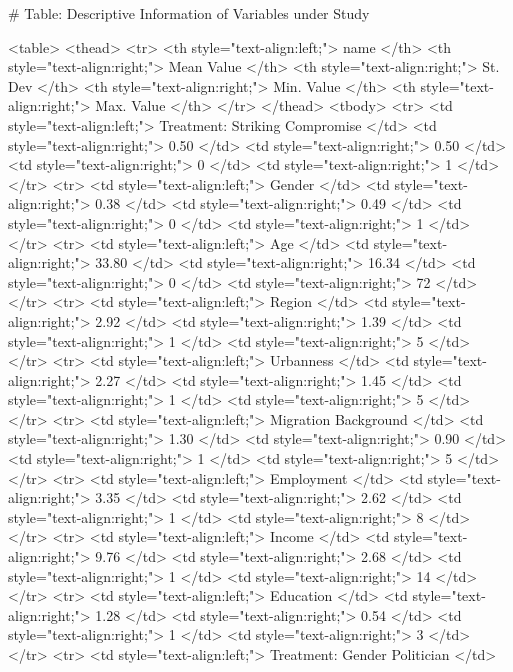 # Table: Descriptive Information of Variables under Study 

<table>
 <thead>
  <tr>
   <th style="text-align:left;"> name </th>
   <th style="text-align:right;"> Mean Value </th>
   <th style="text-align:right;"> St. Dev </th>
   <th style="text-align:right;"> Min. Value </th>
   <th style="text-align:right;"> Max. Value </th>
  </tr>
 </thead>
<tbody>
  <tr>
   <td style="text-align:left;"> Treatment: Striking Compromise </td>
   <td style="text-align:right;"> 0.50 </td>
   <td style="text-align:right;"> 0.50 </td>
   <td style="text-align:right;"> 0 </td>
   <td style="text-align:right;"> 1 </td>
  </tr>
  <tr>
   <td style="text-align:left;"> Gender </td>
   <td style="text-align:right;"> 0.38 </td>
   <td style="text-align:right;"> 0.49 </td>
   <td style="text-align:right;"> 0 </td>
   <td style="text-align:right;"> 1 </td>
  </tr>
  <tr>
   <td style="text-align:left;"> Age </td>
   <td style="text-align:right;"> 33.80 </td>
   <td style="text-align:right;"> 16.34 </td>
   <td style="text-align:right;"> 0 </td>
   <td style="text-align:right;"> 72 </td>
  </tr>
  <tr>
   <td style="text-align:left;"> Region </td>
   <td style="text-align:right;"> 2.92 </td>
   <td style="text-align:right;"> 1.39 </td>
   <td style="text-align:right;"> 1 </td>
   <td style="text-align:right;"> 5 </td>
  </tr>
  <tr>
   <td style="text-align:left;"> Urbanness </td>
   <td style="text-align:right;"> 2.27 </td>
   <td style="text-align:right;"> 1.45 </td>
   <td style="text-align:right;"> 1 </td>
   <td style="text-align:right;"> 5 </td>
  </tr>
  <tr>
   <td style="text-align:left;"> Migration Background </td>
   <td style="text-align:right;"> 1.30 </td>
   <td style="text-align:right;"> 0.90 </td>
   <td style="text-align:right;"> 1 </td>
   <td style="text-align:right;"> 5 </td>
  </tr>
  <tr>
   <td style="text-align:left;"> Employment </td>
   <td style="text-align:right;"> 3.35 </td>
   <td style="text-align:right;"> 2.62 </td>
   <td style="text-align:right;"> 1 </td>
   <td style="text-align:right;"> 8 </td>
  </tr>
  <tr>
   <td style="text-align:left;"> Income </td>
   <td style="text-align:right;"> 9.76 </td>
   <td style="text-align:right;"> 2.68 </td>
   <td style="text-align:right;"> 1 </td>
   <td style="text-align:right;"> 14 </td>
  </tr>
  <tr>
   <td style="text-align:left;"> Education </td>
   <td style="text-align:right;"> 1.28 </td>
   <td style="text-align:right;"> 0.54 </td>
   <td style="text-align:right;"> 1 </td>
   <td style="text-align:right;"> 3 </td>
  </tr>
  <tr>
   <td style="text-align:left;"> Treatment: Gender Politician </td>

